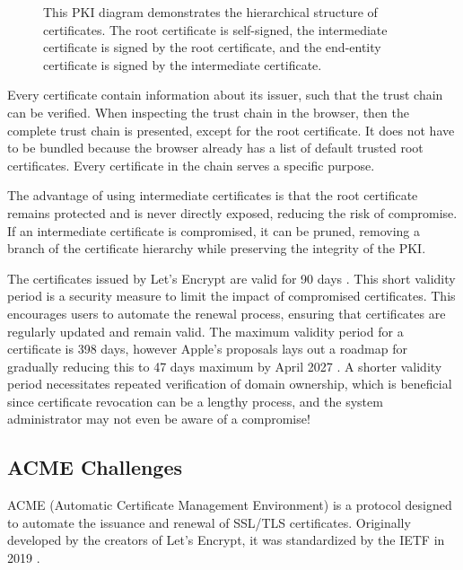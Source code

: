 \begin{figure}[h]
    \centering
    
    \caption{This PKI diagram demonstrates the hierarchical structure of certificates. The root certificate is self-signed, the intermediate certificate is signed by the root certificate, and the end-entity certificate is signed by the intermediate certificate.}
    \label{fig:pki_diagram}
\end{figure}

Every certificate contain information about its issuer, such that the trust chain can be verified. When inspecting the trust chain in the browser, then the complete trust chain is presented, except for the root certificate. It does not have to be bundled because the browser already has a list of default trusted root certificates. Every certificate in the chain serves a specific purpose.

The advantage of using intermediate certificates is that the root certificate remains protected and is never directly exposed, reducing the risk of compromise. If an intermediate certificate is compromised, it can be pruned, removing a branch of the certificate hierarchy while preserving the integrity of the PKI.

The certificates issued by Let's Encrypt are valid for 90 days \Parencite{letsencrypt_faq}. This short validity period is a security measure to limit the impact of compromised certificates. This encourages users to automate the renewal process, ensuring that certificates are regularly updated and remain valid. The maximum validity period for a certificate is 398 days, however Apple's proposals lays out a roadmap for gradually reducing this to 47 days maximum by April 2027 \Parencite{globalsign_certificate_lifespans}. A shorter validity period necessitates repeated verification of domain ownership, which is beneficial since certificate revocation can be a lengthy process, and the system administrator may not even be aware of a compromise!

\subsection{ACME Challenges}\label{sec:acme_challenges}
ACME (Automatic Certificate Management Environment) is a protocol designed to automate the issuance and renewal of SSL/TLS certificates. Originally developed by the creators of Let's Encrypt, it was standardized by the IETF in 2019 \parencite{letsencrypt_isrg_anniversary}.

